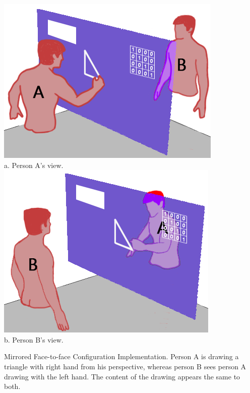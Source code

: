 \documentclass[sigchi-a]{acmart}
\begin{document}
\begin{marginfigure}
        \includegraphics[width=0.75\marginparwidth]{personA}\\
        a. Person A's view. 
        \includegraphics[width=0.75\marginparwidth]{personB}\\
        b. Person B's view.
    \caption{Mirrored Face-to-face Configuration Implementation. Person A is drawing a triangle with right hand from his perspective, whereas person B sees person A drawing with the left hand. The content of the drawing appears the same to both.}
    \label{fig:marginfig:mirror}
\end{marginfigure}
\end{document}

